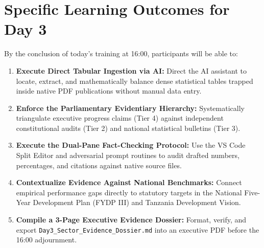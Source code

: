 \documentclass[11pt, a4paper]{report}
\begin{document}
\section{Specific Learning Outcomes for Day 3}
By the conclusion of today's training at 16:00, participants will be able to:
\begin{enumerate}[label=\textbf{3.\arabic*}]
    \item \textbf{Execute Direct Tabular Ingestion via AI:} Direct the AI assistant to locate, extract, and mathematically balance dense statistical tables trapped inside native PDF publications without manual data entry.
    \item \textbf{Enforce the Parliamentary Evidentiary Hierarchy:} Systematically triangulate executive progress claims (Tier 4) against independent constitutional audits (Tier 2) and national statistical bulletins (Tier 3).
    \item \textbf{Execute the Dual-Pane Fact-Checking Protocol:} Use the VS Code Split Editor and adversarial prompt routines to audit drafted numbers, percentages, and citations against native source files.
    \item \textbf{Contextualize Evidence Against National Benchmarks:} Connect empirical performance gaps directly to statutory targets in the National Five-Year Development Plan (FYDP III) and Tanzania Development Vision.
    \item \textbf{Compile a 3-Page Executive Evidence Dossier:} Format, verify, and export \texttt{Day3\_Sector\_Evidence\_Dossier.md} into an executive PDF before the 16:00 adjournment.
\end{enumerate}
\end{document}
